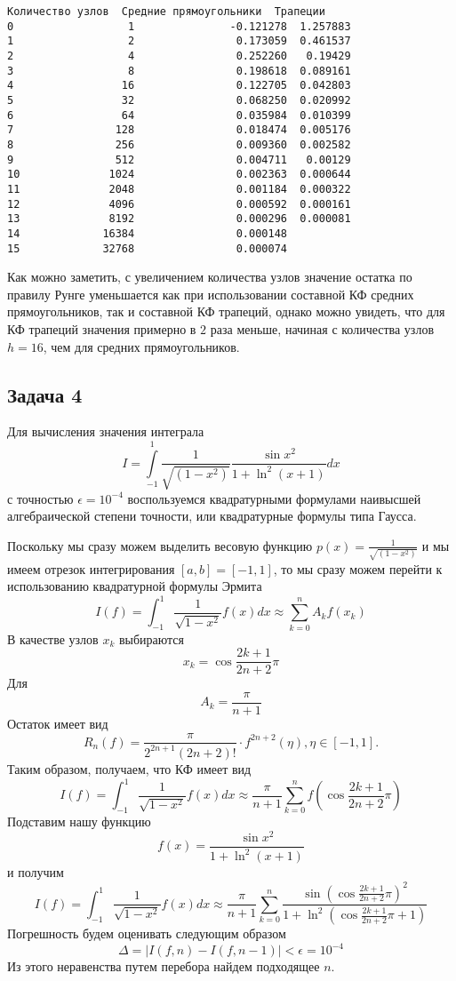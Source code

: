 \documentclass[11pt]{article}
\makeatletter
\newcommand{\boxspacing}{\kern\kvtcb@left@rule\kern\kvtcb@boxsep}
\newcommand{\prompt}[4]{
        {\ttfamily\llap{{\color{#2}[#3]:\hspace{3pt}#4}}\vspace{-\baselineskip}}
    }
\makeatother
\begin{document}
            \begin{tcolorbox}[breakable, size=fbox, boxrule=.5pt, pad at break*=1mm, opacityfill=0]
\prompt{Out}{outcolor}{19}{\boxspacing}
\begin{Verbatim}[commandchars=\\\{\}]
    Количество узлов  Средние прямоугольники  Трапеции
0                  1               -0.121278  1.257883
1                  2                0.173059  0.461537
2                  4                0.252260   0.19429
3                  8                0.198618  0.089161
4                 16                0.122705  0.042803
5                 32                0.068250  0.020992
6                 64                0.035984  0.010399
7                128                0.018474  0.005176
8                256                0.009360  0.002582
9                512                0.004711   0.00129
10              1024                0.002363  0.000644
11              2048                0.001184  0.000322
12              4096                0.000592  0.000161
13              8192                0.000296  0.000081
14             16384                0.000148
15             32768                0.000074
\end{Verbatim}
\end{tcolorbox}
        
    Как можно заметить, с увеличением количества узлов значение остатка по
правилу Рунге уменьшается как при использовании составной КФ средних
прямоугольников, так и составной КФ трапеций, однако можно увидеть, что
для КФ трапеций значения примерно в \(2\) раза меньше, начиная с
количества узлов \(h=16\), чем для средних прямоугольников.

    \subsection*{Задача 4}

Для вычисления значения интеграла
\[I = \int\limits_{-1}^1 \frac{1}{\sqrt{(1-x^2)}} \dfrac{\sin x^2}{1 + \ln^2(x+1)}dx\]
с точностью \(\epsilon=10^{-4}\) воспользуемся квадратурными формулами
наивысшей алгебраической степени точности, или квадратурные формулы типа
Гаусса.

Поскольку мы сразу можем выделить весовую функцию
\(p(x)=\frac{1}{\sqrt{(1-x^2)}}\) и мы имеем отрезок интегрирования
\([a,b]=[-1,1]\), то мы сразу можем перейти к использованию квадратурной
формулы Эрмита
\[I(f)=\int_{-1}^1 \frac{1}{\sqrt{1-x^2}}f(x)dx \approx \sum_{k=0}^nA_kf(x_k)\]
В качестве узлов \(x_k\) выбираются \[x_k=\cos{\frac{2k+1}{2n+2} \pi}\]
Для \[A_k=\frac{\pi}{n+1}\] Остаток имеет вид
\[R_n(f) = \frac{\pi}{2^{2n+1}(2n+2)!} \cdot f^{2n+2}(\eta), \eta \in [-1,1].\]
Таким образом, получаем, что КФ имеет вид
\[I(f)=\int_{-1}^1 \frac{1}{\sqrt{1-x^2}}f(x)dx \approx \frac{\pi}{n+1}\sum_{k=0}^nf(\cos{\frac{2k+1}{2n+2} \pi})\]
Подставим нашу функцию \[f(x) =  \dfrac{\sin x^2}{1 + \ln^2(x+1)}\] и
получим
\[I(f)=\int_{-1}^1 \frac{1}{\sqrt{1-x^2}}f(x)dx \approx \frac{\pi}{n+1}\sum_{k=0}^n\dfrac{\sin (\cos{\frac{2k+1}{2n+2} \pi})^2}{1 + \ln^2(\cos{\frac{2k+1}{2n+2} \pi}+1)}\]
Погрешность будем оценивать следующим образом
\[\Delta = |I(f,n)-I(f,n-1)| < \epsilon = 10^{-4}\] Из этого неравенства
путем перебора найдем подходящее \(n\).
\end{document}
